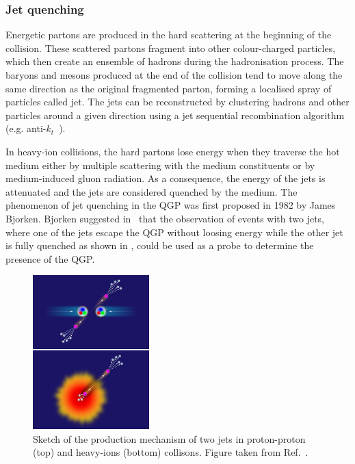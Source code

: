 \subsubsection{Jet quenching}

Energetic partons are produced in the hard scattering at the beginning of the collision. These scattered partons fragment into other colour-charged particles, which then create an ensemble of hadrons during the hadronisation process. The baryons and mesons produced at the end of the collision tend to move along the same direction as the original fragmented parton, forming a localised spray of particles called jet. The jets can be reconstructed by clustering hadrons and other particles around a given direction using a jet sequential recombination algorithm (e.g. anti-$k_{t}$~\cite{AntikT}).

In heavy-ion collisions, the hard partons lose energy when they traverse the hot medium either by multiple scattering with the medium constituents or by medium-induced gluon radiation. As a consequence, the energy of the jets is attenuated and the jets are considered quenched by the medium. The phenomenon of jet quenching in the QGP was first proposed in 1982 by James Bjorken. Bjorken suggested in~\cite{BjorkenJetQuenching} that the observation of events with two jets, where one of the jets escape the QGP without loosing energy while the other jet is fully quenched as shown in , could be used as a probe to determine the presence of the QGP.

\begin{figure}[!htb]
 \centering
 \includegraphics[width=0.4\textwidth]{Figures/Introduction/HeavyIons/JetQuenching.png}
 \caption{Sketch of the production mechanism of two jets in proton-proton (top) and heavy-ions (bottom) collisons. Figure taken from Ref.~\cite{FigureJetQuenching}.}
 \label{fig:JetQuenching}
\end{figure}

